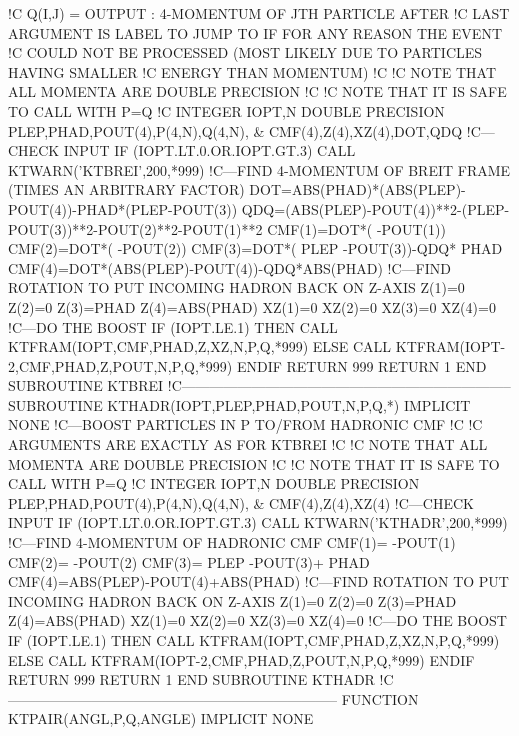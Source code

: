 !C   Q(I,J)  = OUTPUT : 4-MOMENTUM OF JTH PARTICLE AFTER
!C   LAST ARGUMENT IS LABEL TO JUMP TO IF FOR ANY REASON THE EVENT
!C   COULD NOT BE PROCESSED (MOST LIKELY DUE TO PARTICLES HAVING SMALLER
!C   ENERGY THAN MOMENTUM)
!C
!C   NOTE THAT ALL MOMENTA ARE DOUBLE PRECISION
!C
!C   NOTE THAT IT IS SAFE TO CALL WITH P=Q
!C
      INTEGER IOPT,N
      DOUBLE PRECISION PLEP,PHAD,POUT(4),P(4,N),Q(4,N), &
           CMF(4),Z(4),XZ(4),DOT,QDQ
!C---CHECK INPUT
      IF (IOPT.LT.0.OR.IOPT.GT.3) CALL KTWARN('KTBREI',200,*999)
!C---FIND 4-MOMENTUM OF BREIT FRAME (TIMES AN ARBITRARY FACTOR)
      DOT=ABS(PHAD)*(ABS(PLEP)-POUT(4))-PHAD*(PLEP-POUT(3))
      QDQ=(ABS(PLEP)-POUT(4))**2-(PLEP-POUT(3))**2-POUT(2)**2-POUT(1)**2
      CMF(1)=DOT*(         -POUT(1))
      CMF(2)=DOT*(         -POUT(2))
      CMF(3)=DOT*(    PLEP -POUT(3))-QDQ*    PHAD
      CMF(4)=DOT*(ABS(PLEP)-POUT(4))-QDQ*ABS(PHAD)
!C---FIND ROTATION TO PUT INCOMING HADRON BACK ON Z-AXIS
      Z(1)=0
      Z(2)=0
      Z(3)=PHAD
      Z(4)=ABS(PHAD)
      XZ(1)=0
      XZ(2)=0
      XZ(3)=0
      XZ(4)=0
!C---DO THE BOOST
      IF (IOPT.LE.1) THEN
         CALL KTFRAM(IOPT,CMF,PHAD,Z,XZ,N,P,Q,*999)
      ELSE
         CALL KTFRAM(IOPT-2,CMF,PHAD,Z,POUT,N,P,Q,*999)
      ENDIF
      RETURN
999   RETURN 1
    END SUBROUTINE KTBREI
!C-----------------------------------------------------------------------
    SUBROUTINE KTHADR(IOPT,PLEP,PHAD,POUT,N,P,Q,*)
      IMPLICIT NONE
!C---BOOST PARTICLES IN P TO/FROM HADRONIC CMF
!C
!C   ARGUMENTS ARE EXACTLY AS FOR KTBREI
!C
!C   NOTE THAT ALL MOMENTA ARE DOUBLE PRECISION
!C
!C   NOTE THAT IT IS SAFE TO CALL WITH P=Q
!C
      INTEGER IOPT,N
      DOUBLE PRECISION PLEP,PHAD,POUT(4),P(4,N),Q(4,N), &
           CMF(4),Z(4),XZ(4)
!C---CHECK INPUT
      IF (IOPT.LT.0.OR.IOPT.GT.3) CALL KTWARN('KTHADR',200,*999)
!C---FIND 4-MOMENTUM OF HADRONIC CMF
      CMF(1)=         -POUT(1)
      CMF(2)=         -POUT(2)
      CMF(3)=    PLEP -POUT(3)+    PHAD
      CMF(4)=ABS(PLEP)-POUT(4)+ABS(PHAD)
!C---FIND ROTATION TO PUT INCOMING HADRON BACK ON Z-AXIS
      Z(1)=0
      Z(2)=0
      Z(3)=PHAD
      Z(4)=ABS(PHAD)
      XZ(1)=0
      XZ(2)=0
      XZ(3)=0
      XZ(4)=0
!C---DO THE BOOST
      IF (IOPT.LE.1) THEN
         CALL KTFRAM(IOPT,CMF,PHAD,Z,XZ,N,P,Q,*999)
      ELSE
         CALL KTFRAM(IOPT-2,CMF,PHAD,Z,POUT,N,P,Q,*999)
      ENDIF
      RETURN
999   RETURN 1
    END SUBROUTINE KTHADR
\nwendcode{}\plusendmoddef
!C-----------------------------------------------------------------------
    FUNCTION KTPAIR(ANGL,P,Q,ANGLE)
      IMPLICIT NONE
